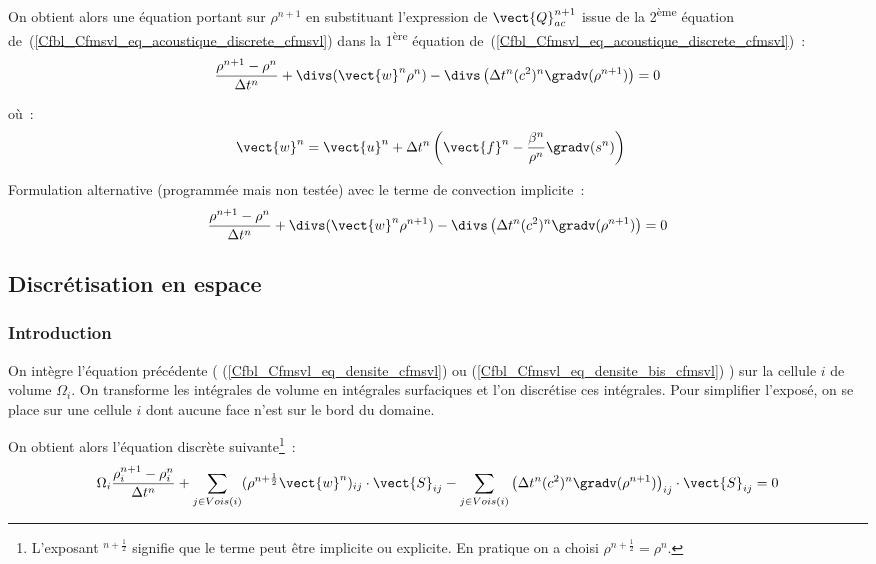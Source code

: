 On obtient alors une équation
portant sur $\rho^{n+1}$ en substituant l'expression de $\vect{Q}_{ac}^{n+1}$
issue de la 2\textsuperscript{ème} équation
de~(\ref{Cfbl_Cfmsvl_eq_acoustique_discrete_cfmsvl})
dans la 1\textsuperscript{ère} équation
de~(\ref{Cfbl_Cfmsvl_eq_acoustique_discrete_cfmsvl})~:
\begin{equation}\label{Cfbl_Cfmsvl_eq_densite_cfmsvl}
\displaystyle\frac{\rho^{n+1}-\rho^n}{\Delta t^n}
+\divs(\vect{w}^n \rho^n)
-\divs\left(\Delta t^n (c^2)^n \gradv(\rho^{n+1})\right) = 0
\end{equation}

où~:
\begin{equation}
\begin{aligned}
\vect{w}^n &= \vect{u}^n + \Delta t^n
\displaystyle\left(\vect{f}^n-\frac{\beta^n}{\rho^n}\gradv(s^n)\right)
\end{aligned}
\end{equation}

Formulation alternative (programmée mais non testée)
avec le terme de convection implicite~:
\begin{equation}\label{Cfbl_Cfmsvl_eq_densite_bis_cfmsvl}
\displaystyle\frac{\rho^{n+1}-\rho^n}{\Delta t^n}
+\divs(\vect{w}^n \rho^{n+1})
-\divs\left(\Delta t^n (c^2)^n \gradv(\rho^{n+1})\right) = 0
\end{equation}


\subsection*{Discrétisation en espace}


\subsubsection*{Introduction}

On intègre l'équation précédente ( (\ref{Cfbl_Cfmsvl_eq_densite_cfmsvl})
ou (\ref{Cfbl_Cfmsvl_eq_densite_bis_cfmsvl}) ) sur la cellule $i$ de volume $\Omega_i$.
On transforme les intégrales de volume en intégrales surfaciques
et l'on discrétise ces intégrales. Pour simplifier l'exposé, on se
place sur une cellule $i$ dont aucune face n'est sur le bord du domaine.

On obtient alors l'équation discrète
suivante\footnote{L'exposant $^{n+\frac{1}{2}}$ signifie que le terme
peut être implicite ou explicite. En pratique on a choisi
$\rho^{n+\frac{1}{2}} = \rho^{n}$.}~:
\begin{equation}\label{Cfbl_Cfmsvl_eq_densite_discrete_cfmsvl}
\Omega_i \displaystyle\frac{\rho_i^{n+1}-\rho_i^n}{\Delta t^n}
+\sum\limits_{j\in Vois(i)}(\rho^{n+\frac{1}{2}} \vect{w}^n)_{ij} \cdot \vect{S}_{ij}
-\sum\limits_{j\in Vois(i)} \left(\Delta t^n (c^2)^n
\gradv(\rho^{n+1})\right)_{ij} \cdot \vect{S}_{ij}
= 0
\end{equation}

